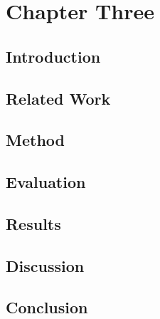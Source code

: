 \documentclass[letterpaper]{tandon_thesis}
\begin{document}
\chapter{Chapter Three}
\label{ch-3}

\section{Introduction}\label{sec:ChapThreeIntroduction}


\section{Related Work}\label{sec:ChapThreeMotivation}


\section{Method}\label{sec:ChapThreeMethod}


\section{Evaluation}\label{sec:ChapThreeEvaluation}


\section{Results}\label{sec:ChapThreeResults}


\section{Discussion}\label{sec:ChapThreeDiscussion} 


\section{Conclusion}\label{sec:ChapThreeConclusion}




{\singlespace
\printbibliography}
\end{document}
